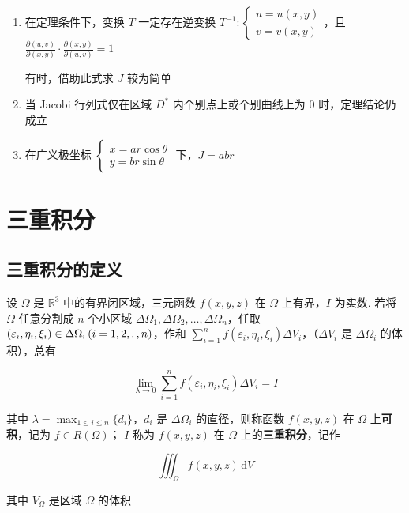 \documentclass[lang = zh , final , oneside , openany , titlepage , zihao = -4 , linespread = 1.3 , baselineskip = false , cjk-font = windows , text-font = newtx , math-font = newtx , math-style = TeX]{sjtureport}
\begin{document}
\begin{enumerate}
\item
  在定理条件下，变换 \(T\) 一定存在逆变换
  \(T^{-1}:\begin{cases}u=u(x,y)\\v=v(x,y)\end{cases}\)，且
  \(\frac{\partial (u,v)}{\partial (x,y)}\cdot \frac{\partial (x,y)}{\partial (u,v)} = 1\)

  有时，借助此式求 \(J\) 较为简单
\item
  当 Jacobi 行列式仅在区域 \(D^*\) 内个别点上或个别曲线上为 \(0\)
  时，定理结论仍成立
\item
  在广义极坐标
  \(\begin{cases}x=ar\cos\theta\\y=br\sin\theta\end{cases}\)
  下，\(J = abr\)
\end{enumerate}

\section{三重积分}

\subsection{三重积分的定义}

\begin{definition}
    设 \(\Omega\) 是 \(\mathbb{R}^3\) 中的有界闭区域，三元函数 \(f(x,y,z)\) 在 \(\Omega\) 上有界，\(I\) 为实数. 若将 \(\Omega\) 任意分割成 \(n\) 个小区域 \(\Delta \Omega_1,\Delta\Omega_2,\ldots,\Delta\Omega_n\)，任取 \(\left(\varepsilon_i,\eta_i,\xi_i \right)\in\Delta\Omega_i\left(i=1,2,\ldotp,n\right)\)，作和 \(\displaystyle\sum_{i=1}^nf\left(\varepsilon_i,\eta_i,\xi_i \right)\Delta V_i\)，（\(\Delta V_i\) 是 \(\Delta\Omega_i\) 的体积），总有

    \[\lim_{\lambda\to 0}\sum_{i=1}^nf\left(\varepsilon_i,\eta_i,\xi_i \right)\Delta V_i = I\]

    其中 \(\lambda = \max_{1\leq i\leq n}\{d_i\}\)，\(d_i\) 是 \(\Delta\Omega_i\) 的直径，则称函数 \(f(x,y,z)\) 在 \(\Omega\) 上\textbf{可积}，记为 \(f\in R(\Omega)\)； \(I\) 称为 \(f(x,y,z)\) 在 \(\Omega\) 上的\textbf{三重积分}，记作

    \[\iiint_\Omega f(x,y,z)\,\mathrm{d}V\]

    其中 \(V_\Omega\) 是区域 \(\Omega\) 的体积
\end{definition}
\end{document}
